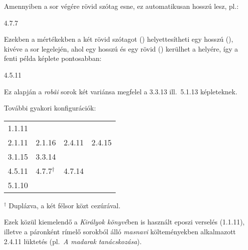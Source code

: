 Amennyiben a sor végére rövid szótag esne, ez automatikusan hosszú
lesz, pl.:
\begin{center}
4{.}7{.}7 \metra{\m\m\b\m\b\m\m}
\end{center}

Ezekben a mértékekben a két rövid szótagot (\metra{\b\b})
helyettesítheti egy hosszú (\metra{\m}), kivéve a sor legelején, ahol
egy hosszú és egy rövid (\metra{\m\b}) kerülhet a helyére, így a fenti
példa képlete pontosabban:
\begin{center}
4{.}5{.}11 \metra{\mb\b\m\m\s\b\m\b\m\s\mbb\m}
\end{center}

Ez alapján a \emph{robâi} sorok két variánsa megfelel a 3{.}3{.}13
ill.~5{.}1{.}13 képleteknek.

\bigskip

További gyakori konfigurációk:
\begin{framed}
\begin{tabular}{llll}
1{.}1{.}11 & {} & {} & {} \\
2{.}1{.}11 & 2{.}1{.}16 & 2{.}4{.}11 & 2{.}4{.}15 \\
3{.}1{.}15 & 3{.}3{.}14 & {} & {} \\
4{.}5{.}11 & 4{.}7{.}7$^\dagger$ & 4{.}7{.}14 & {} \\
5{.}1{.}10 & {} & {} & {}
\end{tabular}

$^\dagger$ Duplázva, a két félsor közt cezúrával.
\end{framed}

\medskip

Ezek közül kiemelendő a \emph{Királyok könyvé\/}ben is használt eposzi verselés (1{.}1{.}11), illetve
a páronként rímelő sorokból álló \emph{masnavi} költeményekben alkalmazott 2{.}4{.}11 lüktetés (pl.~\emph{A madarak tanácskozása}).
